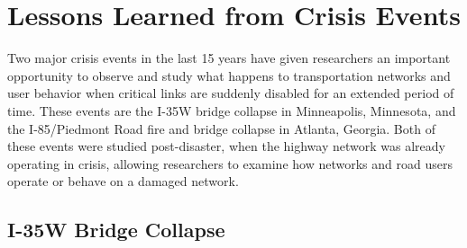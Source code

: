 \begin{table}

\caption{AEM Criticality Score \citet{aem2017}}
\label{tab:aemscore}
\end{table}

\section{Lessons Learned from Crisis Events}

Two major crisis events in the last 15 years have given researchers
an important opportunity
to observe and study what happens to transportation networks and user behavior when critical links are
suddenly disabled for an
extended period of time. These events are the I-35W bridge
collapse in
Minneapolis, Minnesota, and the I-85/Piedmont Road fire and bridge
collapse in Atlanta, Georgia. Both of these events were studied post-disaster,
when the highway network was already operating in crisis, allowing researchers
to examine how networks and road users operate or behave on a damaged network.

\subsection{I-35W Bridge Collapse}

